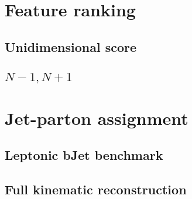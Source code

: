 \label{sec:kin}
\minitoc


\section{Feature ranking}
\subsection{Unidimensional score}
\subsection{{$N-1,N+1$}}
\section{Jet-parton assignment}
\subsection{Leptonic bJet benchmark}
\subsection{Full kinematic reconstruction}

